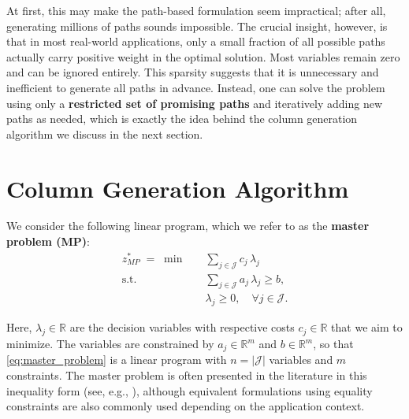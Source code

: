 \documentclass{book}
\theoremstyle{definition}
\newcounter{algorithm_}
\numberwithin{algorithm_}{chapter}
\begin{document}
\bigskip

At first, this may make the path-based formulation seem impractical; after all, generating millions of paths sounds impossible. 
The crucial insight, however, is that in most real-world applications, only a small fraction of all possible paths actually carry positive weight in the optimal solution. Most variables remain zero and can be ignored entirely. This sparsity suggests that it is unnecessary and inefficient to generate all paths in advance. Instead, one can solve the problem using only a \textbf{restricted set of promising paths} and iteratively adding new paths as needed, which is exactly the idea behind the column generation algorithm we discuss in the next section.


\newpage

\section{Column Generation Algorithm}
\label{sec:Column Generation Algorithm}

We consider the following linear program, which we refer to as the \textbf{master problem (MP)}:
\begin{subequations}\label{eq:master_problem}
\begin{align}
z_{MP}^* \;=\; \min \quad & \sum_{j \in \mathcal{J}} c_j \, \lambda_j \label{eq:mp_obj} \\[1mm]
\text{s.t.} \quad 
& \sum_{j \in \mathcal{J}} a_j \, \lambda_j \geq b, \label{eq:mp_constraints} \\[1mm]
& \lambda_j \ge 0, \quad \forall j \in \mathcal{J}. \label{eq:mp_nonneg}
\end{align}
\end{subequations}

Here, $\lambda_j \in \mathbb{R}$ are the decision variables with respective costs $c_j \in \mathbb{R}$ that we aim to minimize.  
The variables are constrained by $a_j \in \mathbb{R}^m$ and $b \in \mathbb{R}^m$, so that \eqref{eq:master_problem} is a linear program with $n = |\mathcal{J}|$ variables and $m$ constraints. The master problem is often presented in the literature in this inequality form (see, e.g., \cite{desaulniers2006column, Lubbecke2011}), although equivalent formulations using equality constraints are also commonly used depending on the application context.

\bigskip
\end{document}
